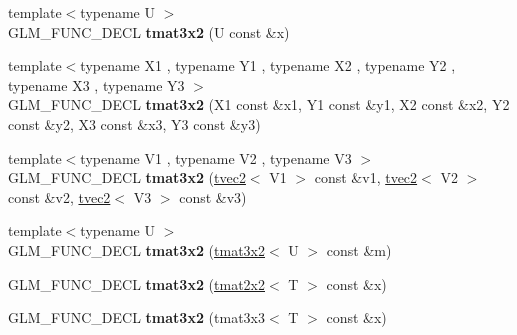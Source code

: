 \begin{DoxyCompactItemize}
\item 
\hypertarget{structglm_1_1detail_1_1tmat3x2_a3dfc353701bc710b38ad9d1d2a3b3c33}{{\footnotesize template$<$typename U $>$ }\\\-G\-L\-M\-\_\-\-F\-U\-N\-C\-\_\-\-D\-E\-C\-L {\bfseries tmat3x2} (\-U const \&x)}\label{structglm_1_1detail_1_1tmat3x2_a3dfc353701bc710b38ad9d1d2a3b3c33}

\item 
\hypertarget{structglm_1_1detail_1_1tmat3x2_a79b47962349e29fa8ecb2b001210818a}{{\footnotesize template$<$typename X1 , typename Y1 , typename X2 , typename Y2 , typename X3 , typename Y3 $>$ }\\\-G\-L\-M\-\_\-\-F\-U\-N\-C\-\_\-\-D\-E\-C\-L {\bfseries tmat3x2} (\-X1 const \&x1, \-Y1 const \&y1, \-X2 const \&x2, \-Y2 const \&y2, \-X3 const \&x3, \-Y3 const \&y3)}\label{structglm_1_1detail_1_1tmat3x2_a79b47962349e29fa8ecb2b001210818a}

\item 
\hypertarget{structglm_1_1detail_1_1tmat3x2_aef9cee068c06d4f17b179a0ed547e9bd}{{\footnotesize template$<$typename V1 , typename V2 , typename V3 $>$ }\\\-G\-L\-M\-\_\-\-F\-U\-N\-C\-\_\-\-D\-E\-C\-L {\bfseries tmat3x2} (\hyperlink{structglm_1_1detail_1_1tvec2}{tvec2}$<$ \-V1 $>$ const \&v1, \hyperlink{structglm_1_1detail_1_1tvec2}{tvec2}$<$ \-V2 $>$ const \&v2, \hyperlink{structglm_1_1detail_1_1tvec2}{tvec2}$<$ \-V3 $>$ const \&v3)}\label{structglm_1_1detail_1_1tmat3x2_aef9cee068c06d4f17b179a0ed547e9bd}

\item 
\hypertarget{structglm_1_1detail_1_1tmat3x2_a803c1e14c376bd263ec8ccae8378f137}{{\footnotesize template$<$typename U $>$ }\\\-G\-L\-M\-\_\-\-F\-U\-N\-C\-\_\-\-D\-E\-C\-L {\bfseries tmat3x2} (\hyperlink{structglm_1_1detail_1_1tmat3x2}{tmat3x2}$<$ \-U $>$ const \&m)}\label{structglm_1_1detail_1_1tmat3x2_a803c1e14c376bd263ec8ccae8378f137}

\item 
\hypertarget{structglm_1_1detail_1_1tmat3x2_a6a485c50629df672e139304600acfa98}{\-G\-L\-M\-\_\-\-F\-U\-N\-C\-\_\-\-D\-E\-C\-L {\bfseries tmat3x2} (\hyperlink{structglm_1_1detail_1_1tmat2x2}{tmat2x2}$<$ \-T $>$ const \&x)}\label{structglm_1_1detail_1_1tmat3x2_a6a485c50629df672e139304600acfa98}

\item 
\hypertarget{structglm_1_1detail_1_1tmat3x2_aa11eb83ebd8b806596808d8fa628022c}{\-G\-L\-M\-\_\-\-F\-U\-N\-C\-\_\-\-D\-E\-C\-L {\bfseries tmat3x2} (tmat3x3$<$ \-T $>$ const \&x)}\label{structglm_1_1detail_1_1tmat3x2_aa11eb83ebd8b806596808d8fa628022c}


\end{DoxyCompactItemize}
